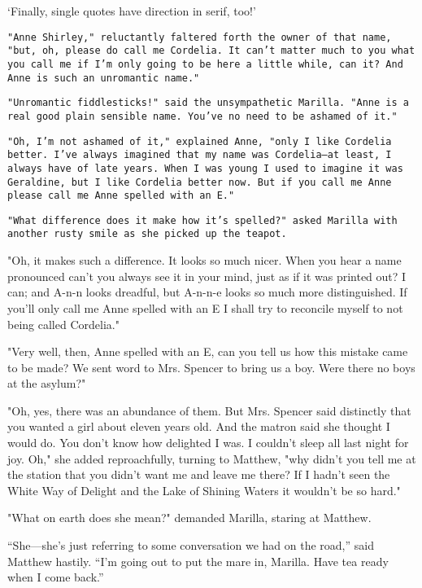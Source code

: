\documentclass[a4paper]{article}
\begin{document}
`Finally, single quotes have direction in serif, too!'

\texttt{"Anne Shirley," reluctantly faltered forth the owner of that name, "but, oh, please do call me Cordelia. It can't matter much to you what you call me if I'm only going to be here a little while, can it? And Anne is such an unromantic name."}

\texttt{"Unromantic fiddlesticks!" said the unsympathetic Marilla. "Anne is a real good plain sensible name. You've no need to be ashamed of it."}

\texttt{"Oh, I'm not ashamed of it," explained Anne, "only I like Cordelia better. I've always imagined that my name was Cordelia---at least, I always have of late years. When I was young I used to imagine it was Geraldine, but I like Cordelia better now. But if you call me Anne please call me Anne spelled with an E."}

\texttt{"What difference does it make how it's spelled?" asked Marilla with another rusty smile as she picked up the teapot.}

\ttfamily "Oh, it makes such a difference. It looks so much nicer. When you hear a name pronounced can't you always see it in your mind, just as if it was printed out? I can; and A-n-n looks dreadful, but A-n-n-e looks so much more distinguished. If you'll only call me Anne spelled with an E I shall try to reconcile myself to not being called Cordelia."

"Very well, then, Anne spelled with an E, can you tell us how this mistake came to be made? We sent word to Mrs. Spencer to bring us a boy. Were there no boys at the asylum?"

"Oh, yes, there was an abundance of them. But Mrs. Spencer said distinctly that you wanted a girl about eleven years old. And the matron said she thought I would do. You don't know how delighted I was. I couldn't sleep all last night for joy. Oh," she added reproachfully, turning to Matthew, "why didn't you tell me at the station that you didn't want me and leave me there? If I hadn't seen the White Way of Delight and the Lake of Shining Waters it wouldn't be so hard."

"What on earth does she mean?" demanded Marilla, staring at Matthew.

\textsf{``She---she's just referring to some conversation we had on the road,'' said Matthew hastily. ``I'm going out to put the mare in, Marilla. Have tea ready when I come back.''}
\end{document}
